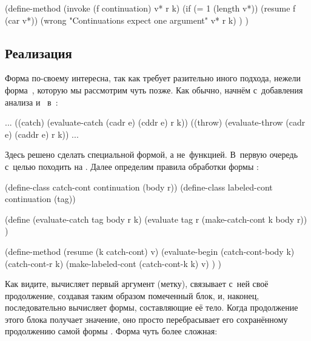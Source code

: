 \begin{code:lisp}
(define-method (invoke (f continuation) v* r k)
  (if (= 1 (length v*))
      (resume f (car v*))
      (wrong "Continuations expect one argument" v* r k) ) )
\end{code:lisp}


\subsection{\texorpdfstring{Реализация \protect{}}{Реализация catch}}%
\label{escape/implementation/ssect:catch}

Форма  по-своему интересна, так как требует разительно иного подхода,
нежели форма~, которую мы рассмотрим чуть позже. Как обычно, начнём
с~добавления анализа  и~ в~:

\begin{code:lisp}
...
((catch) (evaluate-catch (cadr e) (cddr e) r k))
((throw) (evaluate-throw (cadr e) (caddr e) r k))
...
\end{code:lisp}

Здесь решено сделать  специальной формой, а не~функцией. В~первую
очередь с~целью походить на {\CommonLisp}. Далее определим правила обработки
формы :

\begin{code:lisp}
(define-class catch-cont   continuation (body r))
(define-class labeled-cont continuation (tag))

(define (evaluate-catch tag body r k)
  (evaluate tag r (make-catch-cont k body r)) )

(define-method (resume (k catch-cont) v)
  (evaluate-begin (catch-cont-body k)
                  (catch-cont-r k)
                  (make-labeled-cont (catch-cont-k k) v) ) )
\end{code:lisp}

Как видите,  вычисляет первый аргумент (метку), связывает с~ней своё
продолжение, создавая таким образом помеченный блок, и, наконец, последовательно
вычисляет формы, составляющие её тело. Когда продолжение этого блока получает
значение, оно просто перебрасывает его сохранённому продолжению самой формы 
. Форма  чуть более сложная:

